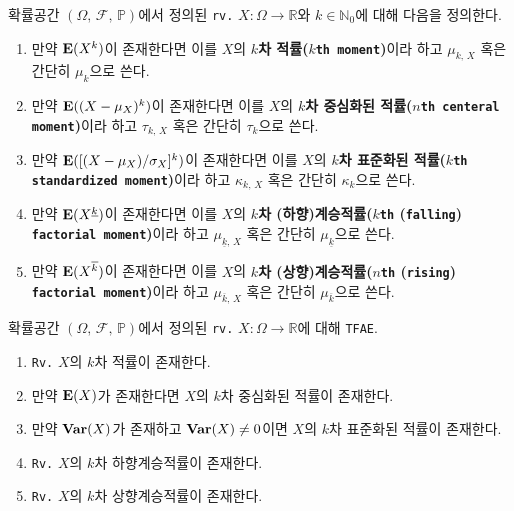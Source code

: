 \begin{definition}
    확률공간 $(\Omega,\,\mathcal{F},\,\mathbb{P})$에서 정의된 \texttt{rv.} $X:\Omega\to\mathbb{R}$와 $k\in\mathbb{N}_0$에 대해 다음을 정의한다.
    \begin{enumerate}
        \item 만약 $\mathbf{E}(X^k)$이 존재한다면 이를 $X$의 \textbf{$k$차 적률($k$\texttt{th moment})}이라 하고 $\mu_{k,\,X}$ 혹은 간단히 $\mu_k$으로 쓴다.
        \item 만약 $\mathbf{E}((X-\mu_X)^k)$이 존재한다면 이를 $X$의 \textbf{$k$차 중심화된 적률($n$\texttt{th centeral moment})}이라 하고 $\tau_{k,\,X}$ 혹은 간단히 $\tau_k$으로 쓴다.
        \item 만약 $\mathbf{E}([(X-\mu_X)/\sigma_X]^k)$이 존재한다면 이를 $X$의 \textbf{$k$차 표준화된 적률($k$\texttt{th standardized moment})}이라 하고 $\kappa_{k,\,X}$ 혹은 간단히 $\kappa_k$으로 쓴다.
        \item 만약 $\mathbf{E}(X^{\underline{k}})$이 존재한다면 이를 $X$의 \textbf{$k$차 (하향)계승적률($k$\texttt{th} (\texttt{falling}) \texttt{factorial moment})}이라 하고 $\mu_{\underline{k},\,X}$ 혹은 간단히 $\mu_{\underline{k}}$으로 쓴다.
        \item 만약 $\mathbf{E}(X^{\overline{k}})$이 존재한다면 이를 $X$의 \textbf{$k$차 (상향)계승적률($n$\texttt{th} (\texttt{rising}) \texttt{factorial moment})}이라 하고 $\mu_{\overline{k},\,X}$ 혹은 간단히 $\mu_{\overline{k}}$으로 쓴다.
    \end{enumerate}
\end{definition}

\begin{proposition}\label{prop:momentExist}
    확률공간 $(\Omega,\,\mathcal{F},\,\mathbb{P})$에서 정의된 \texttt{rv.} $X:\Omega\to\mathbb{R}$에 대해 \texttt{TFAE}.
    \begin{enumerate}
        \item \texttt{Rv.} $X$의 $k$차 적률이 존재한다.
        \item 만약 $\mathbf{E}(X)$가 존재한다면 $X$의 $k$차 중심화된 적률이 존재한다.
        \item 만약 $\mathbf{Var}(X)$가 존재하고 $\mathbf{Var}(X)\ne0$이면 $X$의 $k$차 표준화된 적률이 존재한다.
        \item \texttt{Rv.} $X$의 $k$차 하향계승적률이 존재한다.
        \item \texttt{Rv.} $X$의 $k$차 상향계승적률이 존재한다.
    \end{enumerate}
\end{proposition}

